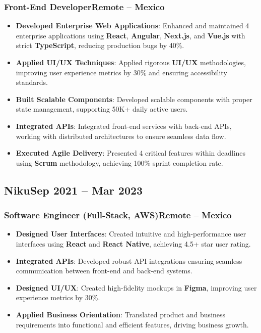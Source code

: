 \documentclass[a4paper,10pt]{article}
\newcommand{\kw}[1]{\textbf{\textcolor{keyword}{#1}}}
\newcommand{\tech}[1]{\textbf{\textcolor{tech}{#1}}}
\begin{document}
\subsubsection*{\small Front-End Developer\hfill Remote -- Mexico}
\begin{itemize}[noitemsep, leftmargin=*]
    \item \textbf{Developed Enterprise Web Applications}: Enhanced and maintained 4 enterprise applications using \tech{React}, \tech{Angular}, \tech{Next.js}, and \tech{Vue.js} with strict \tech{TypeScript}, reducing production bugs by 40\%.
    \item \textbf{Applied UI/UX Techniques}: Applied rigorous \kw{UI/UX} methodologies, improving user experience metrics by 30\% and ensuring accessibility standards.
    \item \textbf{Built Scalable Components}: Developed scalable components with proper state management, supporting 50K+ daily active users.
    \item \textbf{Integrated APIs}: Integrated front-end services with back-end APIs, working with distributed architectures to ensure seamless data flow.
    \item \textbf{Executed Agile Delivery}: Presented 4 critical features within deadlines using \kw{Scrum} methodology, achieving 100\% sprint completion rate.
\end{itemize}

\subsection*{\small Niku\hfill\textbf{Sep 2021 -- Mar 2023}}
\subsubsection*{\small Software Engineer (Full-Stack, AWS)\hfill Remote -- Mexico}
\begin{itemize}[noitemsep, leftmargin=*]
    \item \textbf{Designed User Interfaces}: Created intuitive and high-performance user interfaces using \tech{React} and \tech{React Native}, achieving 4.5+ star user rating.
    \item \textbf{Integrated APIs}: Developed robust API integrations ensuring seamless communication between front-end and back-end systems.
    \item \textbf{Designed UI/UX}: Created high-fidelity mockups in \tech{Figma}, improving user experience metrics by 30\%.
    \item \textbf{Applied Business Orientation}: Translated product and business requirements into functional and efficient features, driving business growth.
\end{itemize}
\end{document}
